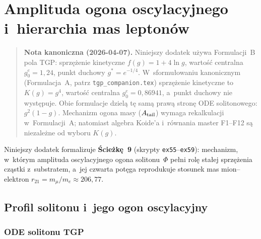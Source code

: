\section{Amplituda ogona oscylacyjnego i~hierarchia mas leptonów}%
\label{app:ogon-masy}

\begin{quote}
\textbf{Nota kanoniczna (2026-04-07).} Niniejszy dodatek używa Formulacji~B pola TGP: sprzężenie kinetyczne $f(g) = 1 + 4\ln g$, wartość centralna $g_0^e = 1{,}24$, punkt duchowy $g^* = e^{-1/4}$. W~sformułowaniu kanonicznym (Formulacja~A, patrz \texttt{tgp\_companion.tex}) sprzężenie kinetyczne to $K(g) = g^4$, wartość centralna $g_0^e = 0{,}86941$, a~punkt duchowy nie występuje. Obie formulacje dzielą tę samą prawą stronę ODE solitonowego: $g^2(1-g)$. Mechanizm ogona masy ($A_{\rm tail}$) wymaga rekalkulacji w~Formulacji~A; natomiast algebra Koide'a i~równania master F1--F12 są niezależne od wyboru $K(g)$.
\end{quote}

Niniejszy dodatek formalizuje \textbf{Ścieżkę~9} (skrypty \texttt{ex55}--\texttt{ex59}):
mechanizm, w~którym amplituda oscylacyjnego ogona solitonu~$\Phi$ pełni
rolę stałej sprzężenia cząstki z~substratem, a~jej czwarta potęga reprodukuje
stosunek mas mion–elektron $r_{21} = m_\mu/m_e \approx 206{,}77$.

\subsection{Profil solitonu i~jego ogon oscylacyjny}\label{app:J-profil}

\subsubsection{ODE solitonu TGP}

